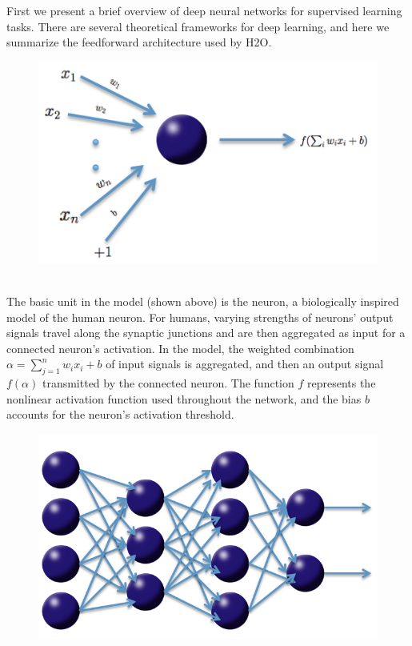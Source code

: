 \documentclass[11pt]{article}
\begin{document}
First we present a brief overview of deep neural networks for supervised learning tasks. There are several theoretical frameworks for deep learning, and here we summarize the feedforward architecture used by H2O. 
\\
\begin{figure}[h]
\centering
\includegraphics[scale=0.5]{neuron.png}
\end{figure}
\\
\noindent
The basic unit in the model (shown above) is the neuron, a biologically inspired model of the human neuron. For humans, varying strengths of neurons' output signals travel along the synaptic junctions and are then aggregated  as input for a connected neuron's activation. In the model, the weighted combination $\alpha = \sum_{j=1}^{n} w_i x_i + b$ of input signals is aggregated, and then an output signal $f(\alpha)$ transmitted by the connected neuron. The function $f$ represents the nonlinear activation function used throughout the network, and the bias $b$ accounts for the neuron's activation threshold. 
\\
\begin{figure}[h!]
\centering
\includegraphics[scale=0.3]{net.png}
\end{figure}
\end{document}

